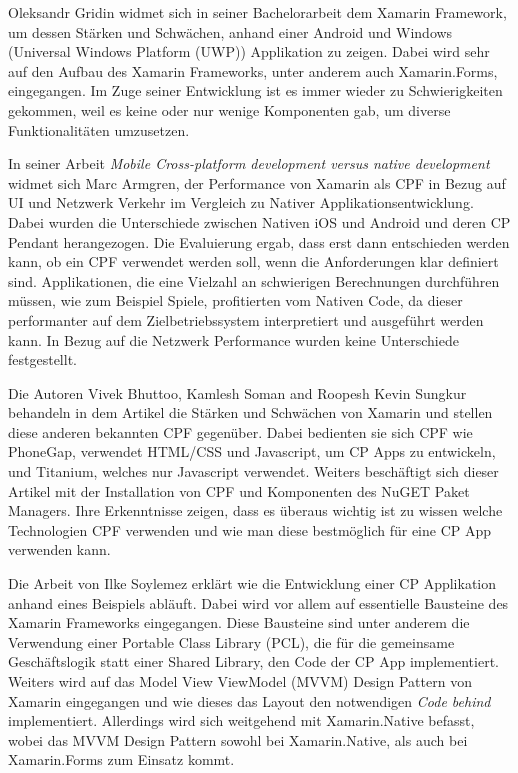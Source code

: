 Oleksandr Gridin widmet sich in seiner Bachelorarbeit \cite{Oleksandr2015} dem Xamarin Framework, um dessen Stärken und Schwächen, anhand einer Android und Windows (Universal Windows Platform (UWP)) Applikation zu zeigen. Dabei wird sehr auf den Aufbau des Xamarin Frameworks, unter anderem auch Xamarin.Forms, eingegangen. Im Zuge seiner Entwicklung ist es immer wieder zu Schwierigkeiten gekommen, weil es keine oder nur wenige Komponenten gab, um diverse Funktionalitäten umzusetzen.

In seiner Arbeit \cite{Armgren852125} \textit{Mobile Cross-platform development versus native development} widmet sich Marc Armgren, der Performance von Xamarin als CPF in Bezug auf UI und Netzwerk Verkehr im Vergleich zu Nativer Applikationsentwicklung. Dabei wurden die Unterschiede zwischen Nativen iOS und Android und deren CP Pendant herangezogen. Die Evaluierung ergab, dass erst dann entschieden werden kann, ob ein CPF verwendet werden soll, wenn die Anforderungen klar definiert sind. Applikationen, die eine Vielzahl an schwierigen Berechnungen durchführen müssen, wie zum Beispiel Spiele, profitierten vom Nativen Code, da dieser performanter auf dem Zielbetriebssystem interpretiert und ausgeführt werden kann. In Bezug auf die Netzwerk Performance wurden keine Unterschiede festgestellt. 

Die Autoren Vivek Bhuttoo, Kamlesh Soman and Roopesh Kevin Sungkur behandeln in dem Artikel \cite{8016193} die Stärken und Schwächen von Xamarin und stellen diese anderen bekannten CPF gegenüber. Dabei bedienten sie sich CPF wie PhoneGap, verwendet HTML/CSS und Javascript, um CP Apps zu entwickeln, und Titanium, welches nur Javascript verwendet. Weiters beschäftigt sich dieser Artikel mit der Installation von CPF und Komponenten des NuGET Paket Managers. Ihre Erkenntnisse zeigen, dass es überaus wichtig ist zu wissen welche Technologien CPF verwenden und wie man diese bestmöglich für eine CP App verwenden kann.

Die Arbeit von Ilke Soylemez \cite{Mukesh2016} erklärt wie die Entwicklung einer CP Applikation anhand eines Beispiels abläuft. Dabei wird vor allem auf essentielle Bausteine des Xamarin Frameworks eingegangen. Diese Bausteine sind unter anderem die Verwendung einer Portable Class Library (PCL), die für die gemeinsame Geschäftslogik statt einer Shared Library, den Code der CP App implementiert. Weiters wird auf das Model View ViewModel (MVVM) Design Pattern von Xamarin eingegangen und wie dieses das Layout den notwendigen \textit{Code behind} implementiert. Allerdings wird sich weitgehend mit Xamarin.Native befasst, wobei das MVVM Design Pattern sowohl bei Xamarin.Native, als auch bei Xamarin.Forms zum Einsatz kommt.


